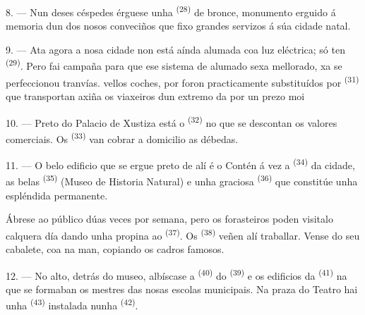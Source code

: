 8. --- Nun deses céspedes érguese unha  \textsuperscript{(28)} de
bronce, monumento erguido á memoria dun dos nosos conveciños que fixo grandes servizos
á súa cidade natal.

\VUsaut{4.0mm}
\VUsaut{3.4mm}

9. --- Ata agora a nosa cidade non está aínda alumada coa luz eléctrica; só ten
 \textsuperscript{(29)}. Pero  fai
campaña para que ese sistema de alumado sexa mellorado,  xa se
perfeccionou  tranvías.  vellos coches,
 por  foron practicamente substituídos por
 \textsuperscript{(31)} que transportan axiña os viaxeiros
dun extremo da  por un prezo moi 

10. --- Preto do Palacio de Xustiza está o  \textsuperscript{(32)} no
que se descontan os valores comerciais. Os 
\textsuperscript{(33)} van cobrar a domicilio as débedas.

\VUsaut{4.0mm}
\VUsaut{3.4mm}

11. --- O belo edificio que se ergue preto de alí é o  Contén á vez a
 \textsuperscript{(34)} da cidade, as belas  \textsuperscript{(35)} (Museo de Historia Natural) e unha graciosa
 \textsuperscript{(36)} que constitúe unha espléndida
 permanente.

Ábrese ao público dúas veces por semana, pero os forasteiros poden visitalo calquera
día dando unha propina ao  \textsuperscript{(37)}. Os 
\textsuperscript{(38)} veñen alí traballar. Vense  do seu cabalete, coa
 na man, copiando os cadros famosos.

12. --- No alto, detrás do museo, albíscase a  \textsuperscript{(40)}
do  \textsuperscript{(39)} e os edificios da 
\textsuperscript{(41)} na que se formaban os mestres das nosas escolas municipais. Na
praza do Teatro hai unha  \textsuperscript{(43)} instalada
nunha  \textsuperscript{(42)}.


